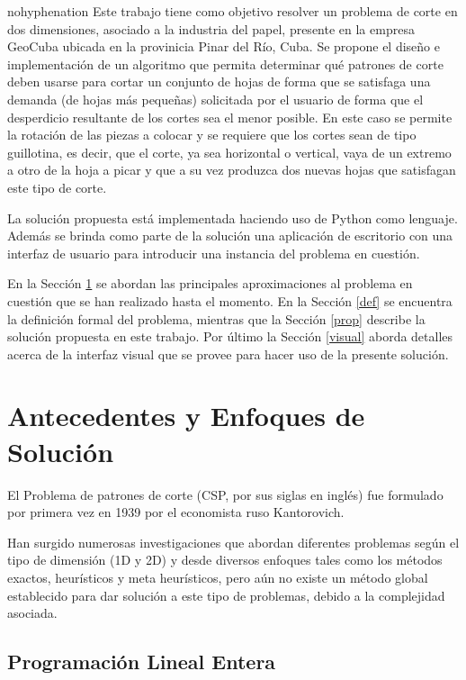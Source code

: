 \documentclass[a4paper,10pt,twocolumn]{article}
\begin{document}
\begin{hyphenrules}{nohyphenation}
Este trabajo tiene como objetivo resolver un problema de corte en dos dimensiones, asociado a la industria del papel, presente en la empresa GeoCuba ubicada en la provinicia Pinar del Río, Cuba. Se propone el  diseño e implementación de un algoritmo que permita determinar qué patrones de corte deben usarse para cortar un conjunto de hojas de forma que se satisfaga una demanda (de hojas más pequeñas) solicitada por el usuario de forma que el desperdicio resultante de los cortes sea el menor posible. En este caso se permite la rotación de las piezas a colocar y se requiere que los cortes sean de tipo guillotina, es decir, que  el corte, ya sea horizontal o vertical, vaya de un extremo a otro de la hoja a picar y que a su vez produzca dos nuevas hojas que satisfagan este tipo de corte. 

La solución propuesta está implementada haciendo uso de Python como lenguaje. Además se brinda como parte de la solución una aplicación de escritorio con una interfaz de usuario para introducir una instancia del problema en cuestión. 

En la Sección \ref{estadodelarte} se abordan las principales aproximaciones al problema en cuestión que se han realizado hasta el momento. En la Sección \ref{def} se encuentra la definición formal del problema, mientras que la Sección \ref{prop} describe la solución propuesta en este trabajo. Por último la Sección \ref{visual} aborda detalles acerca de la interfaz visual que se provee para hacer uso de la presente solución.


\section{Antecedentes y Enfoques de Solución}\label{estadodelarte}
El Problema de patrones de corte (CSP, por sus siglas
en inglés) fue formulado por primera vez en 1939
por el economista ruso Kantorovich.

Han surgido numerosas investigaciones que abordan
diferentes problemas según el tipo de dimensión (1D y
2D) y desde diversos enfoques tales como los métodos
exactos, heurísticos y meta heurísticos, pero aún no
existe un método global establecido para dar solución
a este tipo de problemas, debido a la complejidad
asociada. 

\subsection{Programación Lineal Entera}


\end{hyphenrules}
\end{document}
